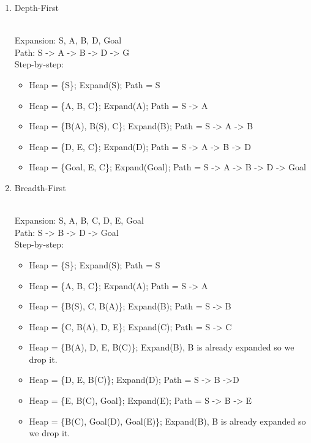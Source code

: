 \documentclass[9pt,a4paper]{extarticle}
\newenvironment{solution}
    {%
    \color{red}
    }
    { 
    \color{black}
    }
\begin{document}
    \begin{enumerate}
        \item Depth-First 
        \begin{solution}
        \\
        Expansion: S, A, B, D, Goal \\
        Path: S -> A -> B -> D -> G \\
        Step-by-step:
        \begin{itemize}
            \item Heap = \{S\}; Expand(S); Path = S
            \item Heap = \{A, B, C\}; Expand(A); Path = S -> A
            \item Heap = \{B(A), B(S), C\}; Expand(B); Path = S -> A -> B
            \item Heap = \{D, E, C\}; Expand(D); Path = S -> A -> B -> D
            \item Heap = \{Goal, E, C\}; Expand(Goal); Path = S -> A -> B -> D -> Goal
        \end{itemize}
        \end{solution}
        \item Breadth-First
        \begin{solution}
        \\
        Expansion: S, A, B, C, D, E, Goal \\
        Path: S -> B -> D -> Goal \\
        Step-by-step:
        \begin{itemize}
            \item Heap = \{S\}; Expand(S); Path = S
            \item Heap = \{A, B, C\}; Expand(A); Path = S -> A
            \item Heap = \{B(S), C, B(A)\}; Expand(B); Path = S -> B
            \item Heap = \{C, B(A), D, E\}; Expand(C); Path = S -> C
            \item Heap = \{B(A), D, E, B(C)\}; Expand(B), B is already expanded so we drop it.
            \item Heap = \{D, E, B(C)\}; Expand(D); Path = S -> B ->D
            \item Heap = \{E, B(C), Goal\}; Expand(E); Path = S -> B -> E
            \item Heap = \{B(C), Goal(D), Goal(E)\}; Expand(B), B is already expanded so we drop it.

\end{itemize}
\end{solution}
\end{enumerate}
\end{document}
